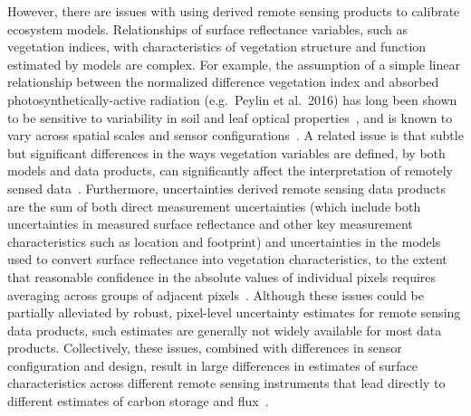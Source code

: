 However, there are issues with using derived remote sensing products to calibrate ecosystem models.
Relationships of surface reflectance variables, such as vegetation indices, with characteristics of vegetation structure and function estimated by models are complex.
For example, the assumption of a simple linear relationship between the normalized difference vegetation index and absorbed photosynthetically-active radiation (e.g.\ Peylin et al.~2016) \nocite{Peylin_2016_stepwise} has long been shown to be sensitive to variability in soil and leaf optical properties~\cite{Myneni_1994_relationship}, and is known to vary across spatial scales and sensor configurations~\cite{Fensholt_2004_evaluation}.
A related issue is that subtle but significant differences in the ways vegetation variables are defined, by both models and data products, can significantly affect the interpretation of remotely sensed data~\cite{Carlson_1997_relation}.
Furthermore, uncertainties derived remote sensing data products are the sum of both direct measurement uncertainties (which include both uncertainties in measured surface reflectance and other key measurement characteristics such as location and footprint) and uncertainties in the models used to convert surface reflectance into vegetation characteristics, to the extent that reasonable confidence in the absolute values of individual pixels requires averaging across groups of adjacent pixels~\cite{Wenze_Yang_2006_modis,Wang_2004_evaluation}.
% 
% 
Although these issues could be partially alleviated by robust, pixel-level uncertainty estimates for remote sensing data products, such estimates are generally not widely available for most data products.
Collectively, these issues, combined with differences in sensor configuration and design, result in large differences in estimates of surface characteristics across different remote sensing instruments that lead directly to different estimates of carbon storage and flux~\cite{Liu_2018_satellite}.

